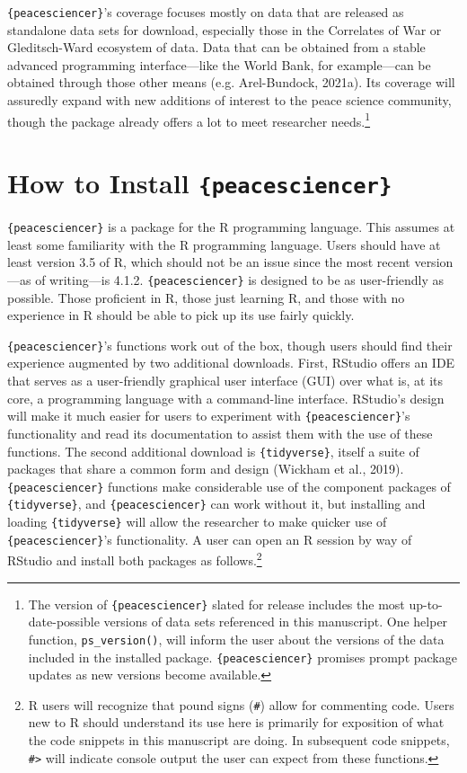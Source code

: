 \documentclass[
  11pt,
]{article}
\begin{document}
\texttt{\{peacesciencer\}}'s coverage focuses mostly on data that are released as standalone data sets for download, especially those in the Correlates of War or Gleditsch-Ward ecosystem of data. Data that can be obtained from a stable advanced programming interface---like the World Bank, for example---can be obtained through those other means (e.g. Arel-Bundock, 2021a). Its coverage will assuredly expand with new additions of interest to the peace science community, though the package already offers a lot to meet researcher needs.\footnote{The version of \texttt{\{peacesciencer\}} slated for release includes the most up-to-date-possible versions of data sets referenced in this manuscript. One helper function, \texttt{ps\_version()}, will inform the user about the versions of the data included in the installed package. \texttt{\{peacesciencer\}} promises prompt package updates as new versions become available.}

\hypertarget{how-to-install-peacesciencer}{%
\section{\texorpdfstring{How to Install \texttt{\{peacesciencer\}}}{How to Install \{peacesciencer\}}}\label{how-to-install-peacesciencer}}

\texttt{\{peacesciencer\}} is a package for the R programming language. This assumes at least some familiarity with the R programming language. Users should have at least version 3.5 of R, which should not be an issue since the most recent version---as of writing---is 4.1.2. \texttt{\{peacesciencer\}} is designed to be as user-friendly as possible. Those proficient in R, those just learning R, and those with no experience in R should be able to pick up its use fairly quickly.

\texttt{\{peacesciencer\}}'s functions work out of the box, though users should find their experience augmented by two additional downloads. First, RStudio offers an IDE that serves as a user-friendly graphical user interface (GUI) over what is, at its core, a programming language with a command-line interface. RStudio's design will make it much easier for users to experiment with \texttt{\{peacesciencer\}}'s functionality and read its documentation to assist them with the use of these functions. The second additional download is \texttt{\{tidyverse\}}, itself a suite of packages that share a common form and design (Wickham et al., 2019). \texttt{\{peacesciencer\}} functions make considerable use of the component packages of \texttt{\{tidyverse\}}, and \texttt{\{peacesciencer\}} can work without it, but installing and loading \texttt{\{tidyverse\}} will allow the researcher to make quicker use of \texttt{\{peacesciencer\}}'s functionality. A user can open an R session by way of RStudio and install both packages as follows.\footnote{R users will recognize that pound signs (\texttt{\#}) allow for commenting code. Users new to R should understand its use here is primarily for exposition of what the code snippets in this manuscript are doing. In subsequent code snippets, \texttt{\#\textgreater{}} will indicate console output the user can expect from these functions.}
\end{document}
